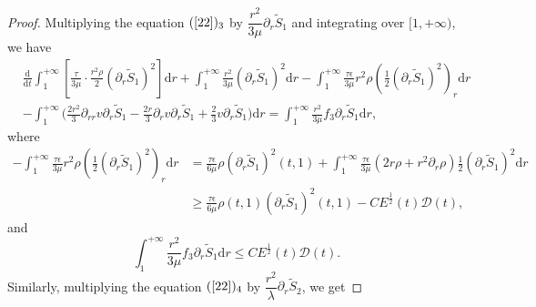 \documentclass[10pt,reqno]{amsart}
\numberwithin{equation}{section}
\begin{document}
\begin{proof}
		Multiplying the equation $(\ref{22})_3$ by $\dfrac{r^2}{3 \mu} \partial_r \tilde{S}_1$ and integrating over $[1,+\infty)$,  we have
		\begin{equation}\label{29}
			\begin{aligned}
				&\frac{\mathrm{d}}{\mathrm{d} t}\int_{1}^{+\infty}\left[\frac{\tau  }{3 \mu} \cdot \frac{r^2 \rho}{2}(\partial_r \tilde{S}_1)^2\right]\mathrm{d}r
				+\int_{1}^{+\infty}\frac{r^2}{3 \mu}(\partial_r \tilde{S}_1)^2\mathrm{d}r
				-\int_{1}^{+\infty}\frac{\tau  \epsilon }{3 \mu}r^2\rho(\frac{1}{2}(\partial_r \tilde{S}_1)^2)_r\mathrm{d}r\\
				&-\int_{1}^{+\infty}\bigg(\frac{2r^2}{3}\partial_{rr}v\partial_r \tilde{S}_1 -\frac{2r}{3}\partial_{r}v\partial_r \tilde{S}_1
				+\frac{2}{3}v\partial_r \tilde{S}_1\bigg)\mathrm{d}r
				=\int_{1}^{+\infty}\frac{r^2}{3\mu}f_3\partial_r \tilde{S}_1\mathrm{d}r ,
			\end{aligned}
		\end{equation}
		where 
		\begin{equation}
			\begin{aligned}
				\nonumber
				-\int_{1}^{+\infty}\frac{\tau \epsilon }{3\mu}r^2\rho(\frac{1}{2}(\partial_r\tilde{S}_1)^2)_r\mathrm{d}r
				&=\frac{\tau \epsilon }{6\mu}\rho (\partial_r\tilde{S}_1)^2(t,1)
				+\int_{1}^{+\infty}\frac{\tau \epsilon }{3\mu}(2r\rho+r^2\partial_{r}\rho)\frac{1}{2}(\partial_r\tilde{S}_1)^2\mathrm{d}r\\
				&
				\geq \frac{\tau \epsilon }{6\mu}\rho(t,1)(\partial_r\tilde{S}_1)^2(t,1)-C E^{\frac{1}{2}}(t) \mathcal{D}(t),
			\end{aligned}
		\end{equation}
		and
		\begin{equation}\nonumber
			\int_{1}^{+\infty}\frac{r^2}{3\mu}f_3\partial_r \tilde{S}_1\mathrm{d}r\leq C E^{\frac{1}{2}}(t) \mathcal{D}(t).
		\end{equation}
		Similarly,  multiplying the equation $(\ref{22})_4$ by $\dfrac{r^2}{\lambda} \partial_r \tilde{S}_2$,  we get

\end{proof}
\end{document}
